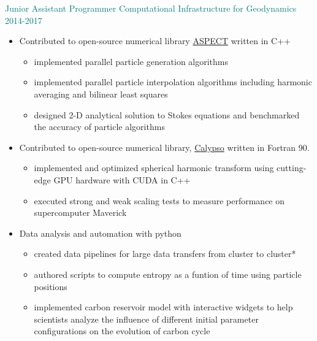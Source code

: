 \documentclass[11pt]{ltxdoc}
\begin{document}
	{\textcolor{teal}{Junior Assistant Programmer} \hfill \textcolor{teal}{Computational Infrastructure for Geodynamics} \hfill \textcolor{teal}{2014-2017}}

      \begin{itemize}
      	
        \item Contributed to open-source numerical library \href{https://github.com/geodynamics/aspect}{ASPECT} written in C++
        
            \begin{itemize}        
            	\item implemented parallel particle generation algorithms
            	\item implemented parallel particle interpolation algorithms including harmonic averaging and bilinear least squares
            	\item designed 2-D analytical solution to Stokes equations and benchmarked the accuracy of particle algorithms
			\end{itemize}
      
		\item Contributed to open-source numerical library,
		\href{https://geodynamics.org/cig/software/calypso/}{Calypso} written in Fortran 90.
  
         	\begin{itemize}
          		\item implemented and optimized spherical harmonic transform using cutting-edge GPU hardware with CUDA in C++
          		\item executed strong and weak scaling tests to measure performance on supercomputer Maverick
          	\end{itemize}
        \item Data analysis and automation with python
        	\begin{itemize}
        		\item created data pipelines for large data transfers from cluster to cluster*
        		\item authored scripts to compute entropy as a funtion of time using particle positions 
        		\item implemented carbon reservoir model with interactive widgets to help scientists analyze the influence of different initial parameter configurations on the evolution of carbon cycle 
        	\end{itemize}            
	\end{itemize}
    
\end{document}
